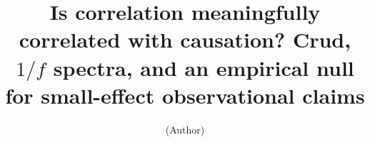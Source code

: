 \documentclass[9pt,twoside,lineno]{pnas-new}
\title{Is correlation meaningfully correlated with causation? Crud, $1/f$ spectra, and an empirical null for small-effect observational claims}
\author{(Author)}
\newcommand{\1}{\mathbf{1}}
\begin{document}
\maketitle

\SItext










\end{document}
